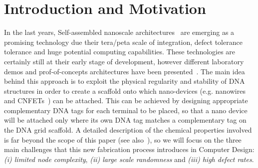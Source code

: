 
\section{Introduction and Motivation}


In the last years, Self-assembled nanoscale architectures~\cite{winfree1998, yan2003}
are emerging as a promising technology due their tera/peta scale of
integration, defect tolerance tolerance and huge potential computing
capabilities. These technologies are certainly still at
their early stage of development, however different laboratory demos and
prof-of-concepts architectures have been presented~\cite{patwardhan2004, patwardhan2006_1, pistol2009}.
The main idea behind this approach is to exploit the physical regularity and
stability of DNA structures in order to create a scaffold onto which
nano-devices (e.g. nanowires and CNFETs~\cite{bachtold2001, tans1998, cui2001}) can be
attached. This can be achieved by designing appropriate complementary DNA tags for
each terminal to be placed, so that a nano device will be attached
only where its own DNA tag matches a complementary tag on the DNA grid
scaffold.
%
A detailed description of the chemical properties involved is far
beyond the scope of this paper (see also~\cite{braun1998, seeman1999}), so we will focus on
the three main challenges that this new fabrication process introduces
in Computer Design: \emph{(i) limited node complexity}, \emph{(ii) large scale
randomness} and \emph{(iii) high defect rates}.  

